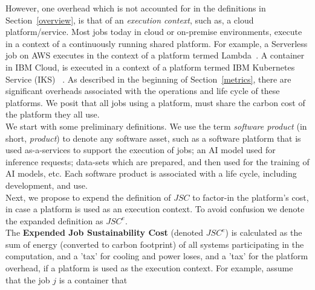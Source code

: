 However, one overhead which is not accounted for in the definitions in Section~\ref{overview}, is that of an {\em execution context}, such as, a cloud platform/service. Most jobs today in cloud or on-premise environments, execute in a context of a continuously running shared platform. For example, a Serverless job on AWS executes in the context of a platform termed Lambda~\cite{}. A container in IBM Cloud, is executed in a context of a platform termed IBM Kubernetes Service (IKS) ~\cite{}. As described in the beginning of Section~\ref{metrics}, there are significant overheads associated 
with the operations and life cycle of these platforms. 
We posit that all jobs using a platform, must share the carbon cost of the platform they all use. 
%
\\
We start with some preliminary definitions. We use the term {\it software product} (in short, {\it product}) to 
denote any software asset, such as a software platform that is used as-a-services to support the execution of jobs; an AI model used for inference requests; data-sets which are prepared, and then used for the training of AI models, etc. Each software product is associated with a life cycle, including development, and use. 
\\
Next, we propose to expend the definition of $JSC$ to factor-in the platform's cost, in case a platform is used as an execution context. 
To avoid confusion we denote the expanded definition as $JSC^e$. \\
The \textbf{Expended Job Sustainability Cost} (denoted $JSC^e$) is calculated as the sum of energy (converted to carbon footprint) of all systems participating in the computation, 
and a 'tax' for cooling and power loses, and a 'tax' for the platform overhead, if a platform is used as the execution context. For example, assume that the job $j$ is a container that
